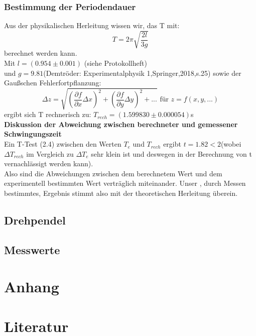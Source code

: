 \documentclass[11pt,a4paper]{article}
\begin{document}
	\subsubsection{Bestimmung der Periodendauer}
	Aus der physikalischen Herleitung wissen wir, das T mit:
	\begin{equation}
	T=2\pi \sqrt{\frac{2l}{3g}}
	\end{equation}
	berechnet werden kann.\\
	Mit $l=(0.954\pm 0.001)$ (siehe Protokollheft) \\ und $g=9.81$(Demtröder: Experimentalphysik 1,Springer,2018,s.25)
	sowie der Gaußschen Fehlerfortpflanzung:
	\begin{equation}
	\Delta z = \sqrt{(\frac{\partial f}{\partial x}\Delta x)^2 +(\frac {\partial f}{\partial y} \Delta y)^2+...} \text{   für   } z=f(x,y,...)
	\end{equation}
	ergibt sich T rechnerisch zu: $T_{rech}=(1.599830\pm0.000054)$s\\
	{\bf Diskussion der Abweichung zwischen berechneter und gemessener Schwingungszeit}\\
	Ein T-Test (2.4) zwischen den Werten $T_e$ und $T_{rech}$ ergibt $t=1.82<2$(wobei $\Delta T_{rech}$ im Vergleich zu $\Delta T_e$ sehr klein ist und deswegen in der Berechnung von t vernachlässigt werden kann).\\
	Also sind die Abweichungen zwischen dem berechnetem Wert und dem experimentell bestimmten Wert
	verträglich miteinander. Unser , durch Messen bestimmtes, Ergebnis stimmt also mit der theoretischen Herleitung überein.
	
	
	\subsection{Drehpendel}
	
	
	
	
	
	
	
	
	
	
\subsection{Messwerte}



\newpage
\section{Anhang}
%

\nocite{*}
\newpage
\section{Literatur}
\newpage
%
\end{document}

